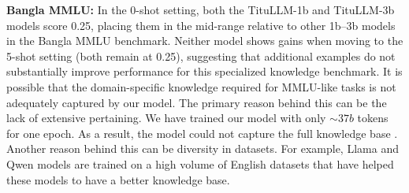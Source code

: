 
\noindent  \textbf{Bangla MMLU:} In the 0-shot setting, both the TituLLM-1b and TituLLM-3b models score 0.25, placing them in the mid-range relative to other 1b--3b models in the Bangla MMLU benchmark. Neither model shows gains when moving to the 5-shot setting (both remain at 0.25), suggesting that additional examples do not substantially improve performance for this specialized knowledge benchmark. It is possible that the domain-specific knowledge required for MMLU-like tasks is not adequately captured by our model. The primary reason behind this can be the lack of extensive pertaining. We have trained our model with only $\sim37b$
tokens for one epoch. As a result, the model could not capture the full knowledge base \cite{hoffmann2022trainingcomputeoptimallargelanguage}. Another reason behind this can be diversity in datasets. For example, Llama and Qwen models are trained on a high volume of English datasets that have helped these models to have a better knowledge base. 

